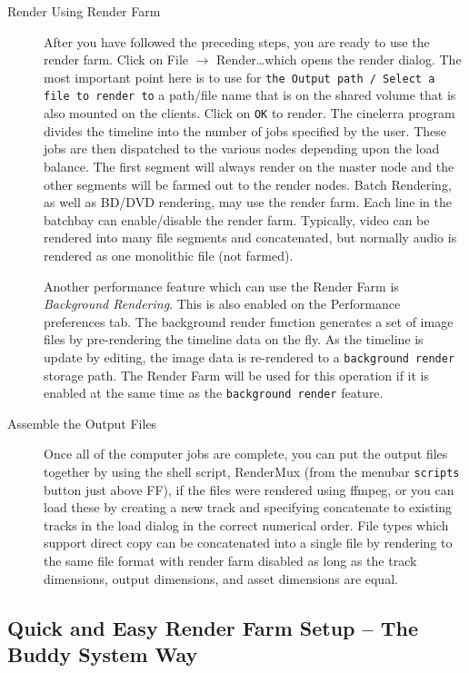 \begin{description}
    \item[Render Using Render Farm] After you have followed the preceding steps, you are ready to use the render farm.  Click on File $\rightarrow$ Render\dots which opens the render dialog.  The most important point here is to use for \texttt{the Output path / Select a file to render to} a path/file name that is on the shared volume that is also mounted on the clients.  Click on \texttt{OK} to render. The cinelerra program divides the timeline into the number of jobs specified by the user.  These jobs are then dispatched to the various nodes depending upon the load balance. The first segment will always render on the master node and the other segments will be farmed out to the render nodes.  Batch Rendering, as well as BD/DVD rendering, may use the render farm.  Each line in the batchbay can enable/disable the render farm.  Typically, video can be rendered into many file segments and concatenated, but normally audio is rendered as one monolithic file (not farmed).
    
    Another performance feature which can use the Render Farm is \textit{Background Rendering}.  This is also enabled on the Performance preferences tab.  The background render function generates a set of image files by pre-rendering the timeline data on the fly.  As the timeline is update by editing, the image data is re-rendered to a \texttt{background render} storage path.  The Render Farm will be used for this operation if it is enabled at the same time as the \texttt{background render} feature.
    \item[Assemble the Output Files] Once all of the computer jobs are complete, you can put the output files together by using the shell script, RenderMux (from the menubar \texttt{scripts} button just above FF), if the files were rendered using ffmpeg, or you can load these by creating a new track and specifying concatenate to existing tracks in the load dialog in the correct numerical order.  File types which support direct copy can be concatenated into a single file by rendering to the same file format with render farm disabled as long as the track dimensions, output dimensions, and asset dimensions are equal.
\end{description}

\subsection{Quick and Easy Render Farm Setup – The Buddy System Way}%
\label{sub:buddy_system_way}

